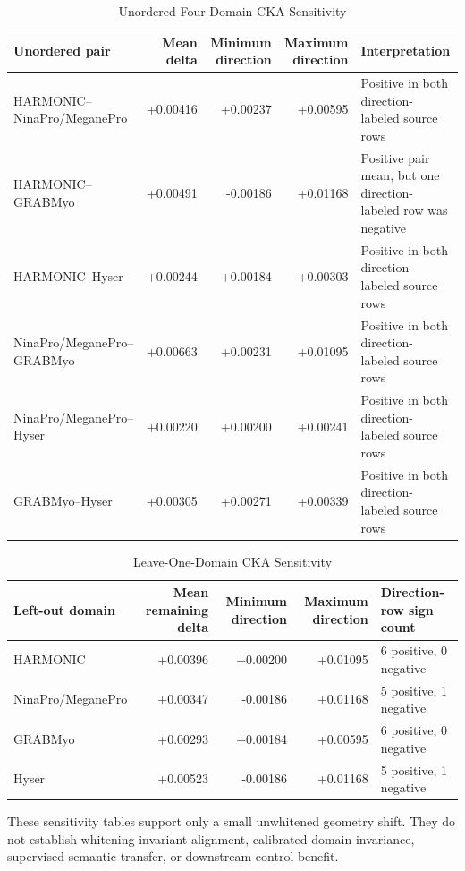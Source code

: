 \documentclass[journal]{IEEEtran}
\begin{document}
\begin{table}[!t]
\caption{Unordered Four-Domain CKA Sensitivity}
\label{tab:s_unorderedcka}
\centering
\footnotesize
\begin{tabularx}{\textwidth}{@{}p{4.1cm}rrrY@{}}
\toprule
Unordered pair & Mean delta & Minimum direction & Maximum direction & Interpretation \\
\midrule
HARMONIC--NinaPro/MeganePro & +0.00416 & +0.00237 & +0.00595 & Positive in both direction-labeled source rows \\
HARMONIC--GRABMyo & +0.00491 & -0.00186 & +0.01168 & Positive pair mean, but one direction-labeled row was negative \\
HARMONIC--Hyser & +0.00244 & +0.00184 & +0.00303 & Positive in both direction-labeled source rows \\
NinaPro/MeganePro--GRABMyo & +0.00663 & +0.00231 & +0.01095 & Positive in both direction-labeled source rows \\
NinaPro/MeganePro--Hyser & +0.00220 & +0.00200 & +0.00241 & Positive in both direction-labeled source rows \\
GRABMyo--Hyser & +0.00305 & +0.00271 & +0.00339 & Positive in both direction-labeled source rows \\
\bottomrule
\end{tabularx}
\end{table}

\begin{table}[!t]
\caption{Leave-One-Domain CKA Sensitivity}
\label{tab:s_leaveonecka}
\centering
\footnotesize
\begin{tabularx}{\textwidth}{@{}p{3.5cm}rrrY@{}}
\toprule
Left-out domain & Mean remaining delta & Minimum direction & Maximum direction & Direction-row sign count \\
\midrule
HARMONIC & +0.00396 & +0.00200 & +0.01095 & 6 positive, 0 negative \\
NinaPro/MeganePro & +0.00347 & -0.00186 & +0.01168 & 5 positive, 1 negative \\
GRABMyo & +0.00293 & +0.00184 & +0.00595 & 6 positive, 0 negative \\
Hyser & +0.00523 & -0.00186 & +0.01168 & 5 positive, 1 negative \\
\bottomrule
\end{tabularx}
\end{table}

These sensitivity tables support only a small unwhitened geometry shift. They do not establish whitening-invariant alignment, calibrated domain invariance, supervised semantic transfer, or downstream control benefit.
\end{document}
